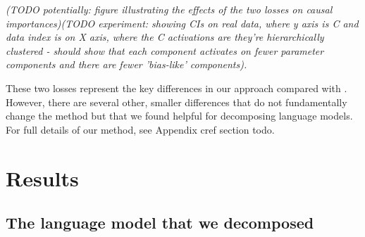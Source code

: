 \documentclass{article}
\begin{document}
\textit{(TODO potentially: figure illustrating the effects of the two losses on causal importances)(TODO experiment: showing CIs on real data, where y axis is C and data index is on X axis, where the C activations are they're hierarchically clustered - should show that each component activates on fewer parameter components and there are fewer 'bias-like' components).}

These two losses represent the key differences in our approach compared with \cite{bushnaq2025spd}. However, there are several other, smaller differences that do not fundamentally change the method but that we found helpful for decomposing language models. For full details of our method, see Appendix cref section todo. 


\section{Results}
\label{sec:results}

\subsection{The language model that we decomposed}
\label{sec:langauge-model-details}

\end{document}
